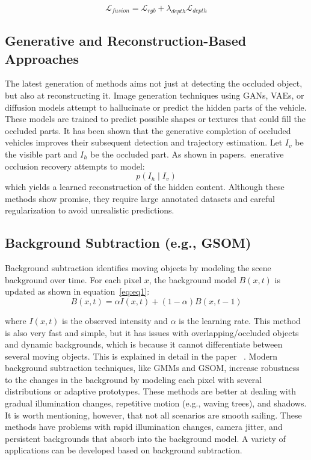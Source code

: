 \documentclass[12pt,a4paper]{report}
\theoremstyle{definition}
\theoremstyle{remark}
\begin{document}
\begin{equation}
\label{eq:3d_fusion}
    \mathcal{L}_{fusion} = \mathcal{L}_{rgb} + \lambda_{depth} \mathcal{L}_{depth}
\end{equation}

\subsection{Generative and Reconstruction-Based Approaches}
The latest generation of methods aims not just at detecting the occluded object, but also at reconstructing it. Image generation techniques using GANs, VAEs, or diffusion models attempt to hallucinate or predict the hidden parts of the vehicle. These models are trained to predict possible shapes or textures that could fill the occluded parts. It has been shown that the generative completion of occluded vehicles improves their subsequent detection and trajectory estimation. Let $I_v$ be the visible part and $I_h$ be the occluded part. As shown in papers.~\cite{paper33,paper14}enerative occlusion recovery attempts to model:
\begin{equation}
p(I_h \mid I_v)
\end{equation}
which yields a learned reconstruction of the hidden content. Although these methods show promise, they require large annotated datasets and careful regularization to avoid unrealistic predictions.

\subsection{Background Subtraction (e.g., GSOM)}
Background subtraction identifies moving objects by modeling the scene background over time. For each pixel $x$, the background model $B(x, t)$ is updated as shown in equation~\ref{eq:eq1}:
\begin{equation}
    \label{eq:eq1}
    B(x, t) = \alpha I(x, t) + (1-\alpha) B(x, t-1)
\end{equation}

where $I(x, t)$ is the observed intensity and $\alpha$ is the learning rate. This method is also very fast and simple, but it has issues with overlapping/occluded objects and dynamic backgrounds, which is because it cannot differentiate between several moving objects. This is explained in detail in the paper ~\cite{paper8}. Modern background subtraction techniques, like GMMs and GSOM, increase robustness to the changes in the background by modeling each pixel with several distributions or adaptive prototypes. These methods are better at dealing with gradual illumination changes, repetitive motion (e.g., waving trees), and shadows. It is worth mentioning, however, that not all scenarios are smooth sailing. These methods have problems with rapid illumination changes, camera jitter, and persistent backgrounds that absorb into the background model. A variety of applications can be developed based on background subtraction.
\end{document}
